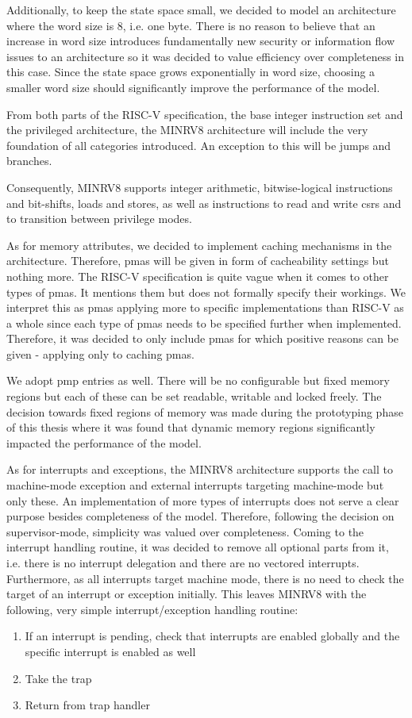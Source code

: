 Additionally, to keep the state space small, we decided to model an architecture where the word size is 8, i.e. one byte.
There is no reason to believe that an increase in word size introduces fundamentally new security or information flow issues to an architecture so it was decided to value efficiency over completeness in this case.
Since the state space grows exponentially in word size, choosing a smaller word size should significantly improve the performance of the model.

From both parts of the RISC-V specification, the base integer instruction set and the privileged architecture, the MINRV8 architecture will include the very foundation of all categories introduced.
An exception to this will be jumps and branches.

Consequently, MINRV8 supports integer arithmetic, bitwise-logical instructions and bit-shifts, loads and stores, as well as instructions to read and write \glspl{csr} and to transition between privilege modes.

As for memory attributes, we decided to implement caching mechanisms in the architecture.
Therefore, \glspl{pma} will be given in form of cacheability settings but nothing more.
The RISC-V specification is quite vague when it comes to other types of \glspl{pma}.
It mentions them but does not formally specify their workings.
We interpret this as \glspl{pma} applying more to specific implementations than RISC-V as a whole since each type of \glspl{pma} needs to be specified further when implemented.
Therefore, it was decided to only include \glspl{pma} for which positive reasons can be given - applying only to caching \glspl{pma}.

We adopt \gls{pmp} entries as well.
There will be no configurable but fixed memory regions but each of these can be set readable, writable and locked freely.
The decision towards fixed regions of memory was made during the prototyping phase of this thesis where it was found that dynamic memory regions significantly impacted the performance of the model.

As for interrupts and exceptions, the MINRV8 architecture supports the call to machine-mode exception and external interrupts targeting machine-mode but only these.
An implementation of more types of interrupts does not serve a clear purpose besides completeness of the model.
Therefore, following the decision on supervisor-mode, simplicity was valued over completeness.
Coming to the interrupt handling routine, it was decided to remove all optional parts from it, i.e. there is no interrupt delegation and there are no vectored interrupts.
Furthermore, as all interrupts target machine mode, there is no need to check the target of an interrupt or exception initially.
This leaves MINRV8 with the following, very simple interrupt/exception handling routine:
\begin{enumerate}
    \item If an interrupt is pending, check that interrupts are enabled globally and the specific interrupt is enabled as well
    \item Take the trap
    \item Return from trap handler
\end{enumerate}

